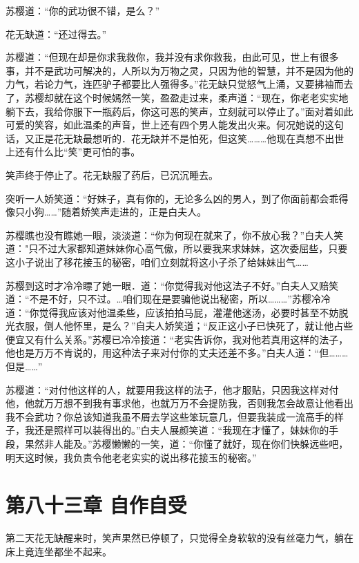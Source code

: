 \documentclass[12pt,oneside]{book}
\begin{document}
苏樱道：``你的武功很不错，是么？''

花无缺道：``还过得去。''

苏樱道：``但现在却是你求我救你，我并没有求你救我，由此可见，世上有很多事，并不是武功可解决的，人所以为万物之灵，只因为他的智慧，并不是因为他的力气，若论力气，连匹驴子都要比人强得多。''花无缺只觉怒气上涌，又要拂袖而去了，苏樱却就在这个时候嫣然一笑，盈盈走过来，柔声道：``现在，你老老实实地躺下去，我给你服下一瓶药后，你这可恶的笑声，立刻就可以停止了。''面对着如此可爱的笑容，如此温柔的声音，世上还有四个男人能发出火来。何况她说的这句话，又正是花无缺最想听的．花无缺并不是怕死，但这笑\ldots\ldots\ldots 他现在真想不出世上还有什么比``笑''更可怕的事。

笑声终于停止了。花无缺服了药后，已沉沉睡去。

突听一人娇笑道：``好妹子，真有你的，无论多么凶的男人，到了你面前都会乖得像只小狗\ldots\ldots{}''随着娇笑声走进的，正是白夫人。

苏樱瞧也没有瞧她一眼，淡淡道：``你为何现在就来了，你不放心我？''白夫人笑道："只不过大家都知道妹妹你心高气傲，所以要我来求妹妹，这次委屈些，只要这小子说出了移花接玉的秘密，咱们立刻就将这小子杀了给妹妹出气\ldots\ldots{}

苏樱到这时才冷冷瞟了她一眼．道：``你觉得我对他这法子不好。''白夫人又赔笑道：``不是不好，只不过。\ldots 咱们现在是要骗他说出秘密，所以\ldots\ldots\ldots{}''苏樱冷冷道：``你觉得我应该对他温柔些，应该拍拍马屁，灌灌他迷汤，必要时甚至不妨脱光衣服，倒人他怀里，是么？''自夫人娇笑道；``反正这小子已快死了，就让他占些便宜又有什么关系。''苏樱已冷冷接道：``老实告诉你，我对他若真用这样的法子，他也是万万不肯说的，用这种法子来对付你的丈夫还差不多。''白夫人道：``但\ldots\ldots\ldots 但是\ldots\ldots{}''

苏樱道：``对付他这样的人，就要用我这样的法子，他才服贴，只因我这样对付他，他就万万想不到我有事求他，也就万万不会提防我，否则我怎会故意让他看出我不会武功？你总该知道我虽不屑去学这些笨玩意几，但要我装成一流高手的样子，我还是照样可以装得出的。''白夫人展颜笑道：``我现在才懂了，妹妹你的手段，果然非人能及。''苏樱懒懒的一笑，道：``你懂了就好，现在你们快躲远些吧，明天这时候，我负责令他老老实实的说出移花接玉的秘密。''

\hypertarget{ux7b2cux516bux5341ux4e09ux7ae0-ux81eaux4f5cux81eaux53d7}{%
\chapter{第八十三章
自作自受}\label{ux7b2cux516bux5341ux4e09ux7ae0-ux81eaux4f5cux81eaux53d7}}

第二天花无缺醒来时，笑声果然已停顿了，只觉得全身软软的没有丝毫力气，躺在床上竟连坐都坐不起来。
\end{document}
